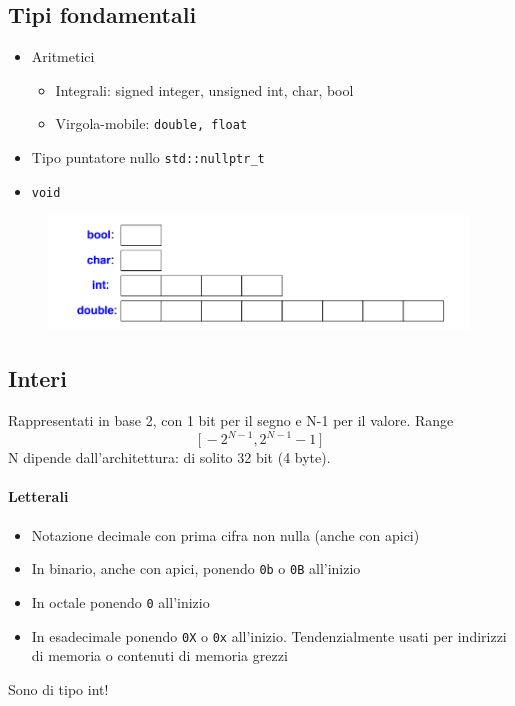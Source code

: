 \documentclass[10pt, oneside]{book}
\begin{document}
\subsection{Tipi fondamentali}
\begin{itemize}
\item Aritmetici
\begin{itemize}
\item Integrali: signed integer, unsigned int, char, bool
\item Virgola-mobile: \texttt{double, float}
\end{itemize}
\item Tipo puntatore nullo \texttt{std::nullptr\_t}
\item \texttt{void}
\end{itemize}

\begin{figure}[h!]
\centering
\includegraphics[scale=0.8]{types.png}
\end{figure}

\subsection{Interi}
Rappresentati in base 2, con 1 bit per il segno e N-1 per il valore. Range
\[\big[ \, -2^{N-1}, 2^{N-1} -1 \, \big]\]
N dipende dall'architettura: di solito 32 bit (4 byte).
\paragraph{Letterali}
\begin{itemize}
\item Notazione decimale con prima cifra non nulla (anche con apici)
\item In binario, anche con apici, ponendo \texttt{0b} o \texttt{0B} all'inizio
\item In octale ponendo \texttt{0} all'inizio
\item In esadecimale ponendo \texttt{0X} o \texttt{0x} all'inizio. Tendenzialmente usati per indirizzi di memoria o contenuti di memoria grezzi
\end{itemize}
Sono di tipo int!
\end{document}
